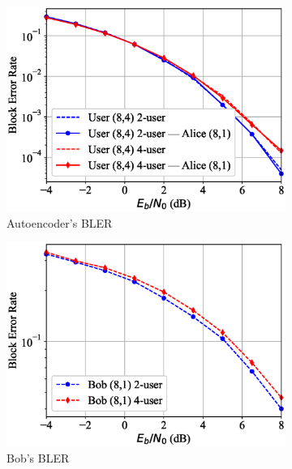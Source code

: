 \begin{figure}[tp!]
	\begin{subfigure}{0.28\textwidth}
		\includegraphics[width=\linewidth]{figs/multi_covert_autoencoder_bler_awgn}
		\caption{Autoencoder's BLER}
		\label{fig:multi_awgn_results_ae}
	\end{subfigure}
	\hspace*{\fill}
	\begin{subfigure}{0.28\textwidth}
		\includegraphics[width=\linewidth]{figs/multi_bob_bler_awgn}
		\caption{Bob's BLER}	
		\label{fig:multi_awgn_results_bob}
	\end{subfigure}
	\hspace*{\fill}
	\begin{subfigure}{0.28\textwidth}

\end{subfigure}
\end{figure}
